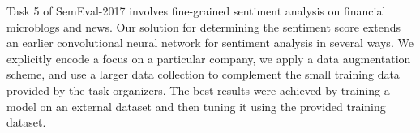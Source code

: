Task 5 of SemEval-2017 involves fine-grained sentiment analysis on financial microblogs and news.  Our solution for determining the sentiment score extends an earlier convolutional neural network for sentiment analysis in several ways. We explicitly encode a focus on a particular company, we apply a data augmentation   scheme, and use a larger data collection to complement the small training data provided by the task organizers.                          The best results were achieved by training a model on an external dataset and then tuning it using the provided training dataset.

